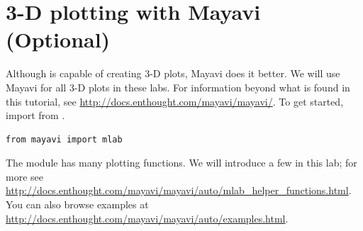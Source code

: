 \section*{3-D plotting with Mayavi (Optional)}

Although  is capable of creating 3-D plots, Mayavi does it better. 
We will use Mayavi for all 3-D plots in these labs.
For information beyond what is found in this tutorial, see \url{http://docs.enthought.com/mayavi/mayavi/}.
To get started, import  from .
\begin{lstlisting}
from mayavi import mlab
\end{lstlisting}

The module  has many plotting functions.
We will introduce a few in this lab; for more see \url{http://docs.enthought.com/mayavi/mayavi/auto/mlab_helper_functions.html}.
You can also browse examples at \url{http://docs.enthought.com/mayavi/mayavi/auto/examples.html}.

